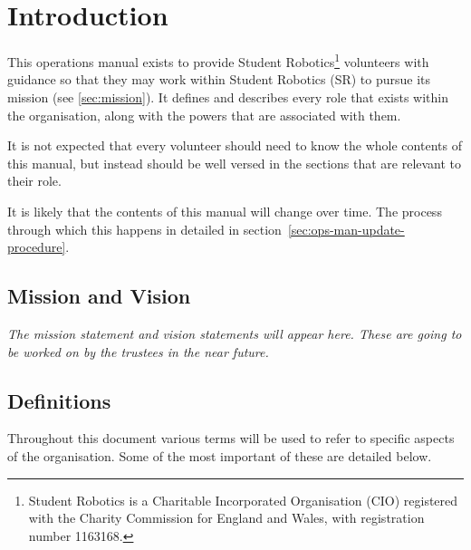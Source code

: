 \chapter{Introduction}

This operations manual exists to provide Student Robotics\footnote{Student Robotics is a Charitable Incorporated Organisation (CIO) registered with the Charity Commission for England and Wales, with registration number 1163168.} volunteers with guidance so that they may work within Student Robotics (SR) to pursue its mission (see \autoref{sec:mission}).  It defines and describes every role that exists within the organisation, along with the powers that are associated with them.

It  is not expected that every volunteer should need to know the whole contents of this manual, but instead should be well versed in the sections that are relevant to their role.

It is likely that the contents of this manual will change over time.  The process through which this happens in detailed in section~\ref{sec:ops-man-update-procedure}.


\section{Mission and Vision}
\label{sec:mission}

\textit{The mission statement and vision statements will appear here.  These are going to be worked on by the trustees in the near future.}

\section{Definitions}

Throughout this document various terms will be used to refer to specific aspects of the organisation. Some of the most important of these are detailed below.

